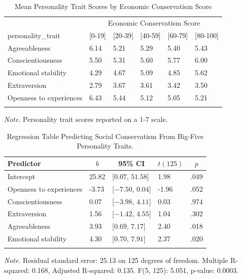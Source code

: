 \documentclass[man]{apa6}
\begin{document}
\begin{table}[tbp]
\begin{center}
\begin{threeparttable}
\caption{\label{tab:table2}Mean Personality Trait Scores by Economic Conservatism Score}
\begin{tabular}{llllll}
\toprule
 & \multicolumn{5}{c}{Economic Conservatism Score} \\
\cmidrule(r){2-6}
personality\_trait & \multicolumn{1}{c}{[0-19]} & \multicolumn{1}{c}{[20-39]} & \multicolumn{1}{c}{[40-59]} & \multicolumn{1}{c}{[60-79]} & \multicolumn{1}{c}{[80-100]}\\
\midrule
Agreeableness & 6.14 & 5.21 & 5.29 & 5.40 & 5.43\\
Conscientiousness & 5.50 & 5.31 & 5.60 & 5.77 & 6.00\\
Emotional stability & 4.29 & 4.67 & 5.09 & 4.85 & 5.62\\
Extraversion & 2.79 & 3.67 & 3.61 & 3.42 & 3.50\\
Openness to experiences & 6.43 & 5.44 & 5.12 & 5.05 & 5.21\\
\bottomrule
\addlinespace
\end{tabular}
\begin{tablenotes}[para]
\normalsize{\textit{Note.} Personality trait scores reported on a 1-7 scale.}
\end{tablenotes}
\end{threeparttable}
\end{center}
\end{table}

\begin{table}[tbp]
\begin{center}
\begin{threeparttable}
\caption{\label{tab:linearmodels_conservatism_ocean_tables}Regression Table Predicting Social Conservatism From Big-Five Personality Traits.}
\begin{tabular}{lllll}
\toprule
Predictor & \multicolumn{1}{c}{$b$} & \multicolumn{1}{c}{95\% CI} & \multicolumn{1}{c}{$t(125)$} & \multicolumn{1}{c}{$p$}\\
\midrule
Intercept & 25.82 & $[0.07$, $51.58]$ & 1.98 & .049\\
Openness to experiences & -3.73 & $[-7.50$, $0.04]$ & -1.96 & .052\\
Conscientiousness & 0.07 & $[-3.98$, $4.11]$ & 0.03 & .974\\
Extraversion & 1.56 & $[-1.42$, $4.55]$ & 1.04 & .302\\
Agreeableness & 3.93 & $[0.69$, $7.17]$ & 2.40 & .018\\
Emotional stability & 4.30 & $[0.70$, $7.91]$ & 2.37 & .020\\
\bottomrule
\addlinespace
\end{tabular}
\begin{tablenotes}[para]
\normalsize{\textit{Note.} Residual standard error: 25.13 on 125 degrees of freedom.
Multiple R-squared: 0.168, Adjusted R-squared: 0.135. F(5, 125): 5.051, p-value: 0.0003.}
\end{tablenotes}
\end{threeparttable}
\end{center}
\end{table}
\end{document}
